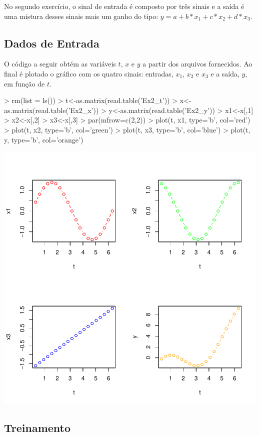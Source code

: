 \documentclass{article}
\begin{document}
No segundo exercício, o sinal de entrada é composto por três sinais e a saída é uma mistura desses sinais mais um ganho do tipo: $y = a + b*x_1 + c*x_2 + d*x_3$.

\subsection{Dados de Entrada}

O código a seguir obtém as variáveis $t$, $x$ e $y$ a partir dos arquivos fornecidos. Ao final é plotado o gráfico com os quatro sinais: entradas, $x_1$, $x_2$ e $x_3$ e a saída, $y$, em função de $t$.

\begin{Schunk}
\begin{Sinput}
>   rm(list = ls())
>   t<-as.matrix(read.table('Ex2_t'))
>   x<-as.matrix(read.table('Ex2_x'))
>   y<-as.matrix(read.table('Ex2_y'))
>   x1<-x[,1]
>   x2<-x[,2]
>   x3<-x[,3]
>   par(mfrow=c(2,2))
>   plot(t, x1, type='b', col='red')
>   plot(t, x2, type='b', col='green')
>   plot(t, x3, type='b', col='blue')
>   plot(t, y, type='b', col='orange')
\end{Sinput}
\end{Schunk}
\includegraphics{adaline-006}

\subsection{Treinamento}
\end{document}
